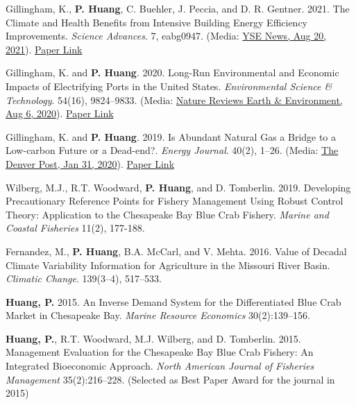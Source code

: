 



\begin{pubitems} %
	\item {Gillingham, K., \textbf{P. Huang}, C. Buehler, J. Peccia, and D. R. Gentner. 2021. The Climate and Health Benefits from Intensive Building Energy Efficiency Improvements. \textit{Science Advances}. 7, eabg0947. (Media: \href{https://environment.yale.edu/news/article/efficient-buildings-could-save-thousands-of-lives-in-us-every-year/}{YSE News, Aug 20, 2021}). \href{https://advances.sciencemag.org/content/7/34/eabg0947}{Paper Link}}
    \item {Gillingham, K. and {\bf P. Huang}. 2020. Long-Run Environmental and Economic Impacts of Electrifying Ports in the United States. \textit{Environmental Science \& Technology}. 54(16), 9824--9833. (Media: \href{https://www.nature.com/articles/s43017-020-0090-6}{Nature Reviews Earth \& Environment, Aug 6, 2020}). \href{https://www.dropbox.com/s/0g1fmsu6kdwhhhg/GillinghamHuang_EST2020.pdf?dl=0}{Paper Link}}
    \item {Gillingham, K. and {\bf P. Huang}. 2019. Is Abundant Natural Gas a Bridge to a Low-carbon Future or a Dead-end?. \textit{Energy Journal}. 40(2), 1--26. (Media: \href{https://www.denverpost.com/2020/01/31/colorado-natural-gas-bridge-fuel-wind-solar-xcel-tri-state/}{The Denver Post, Jan 31, 2020}). \href{https://www.iaee.org/en/Publications/ejarticle.aspx?id=3325}{Paper Link}}
    \item {Wilberg, M.J., R.T. Woodward, {\bf P. Huang}, and D. Tomberlin. 2019. Developing Precautionary Reference Points for Fishery Management Using Robust Control Theory: Application to the Chesapeake Bay Blue Crab Fishery. \textit{Marine and Coastal Fisheries} 11(2), 177-188.}
    \item {Fernandez, M., {\bf P. Huang}, B.A. McCarl, and V. Mehta. 2016. Value of Decadal Climate Variability Information for Agriculture in the Missouri River Basin. \textit{Climatic Change}. 139(3--4), 517--533.}
    \item {\textbf{Huang, P.} 2015. An Inverse Demand System for the Differentiated Blue Crab Market in Chesapeake Bay. {\itshape Marine Resource Economics} 30(2):139--156.}
    \item {\textbf{Huang, P.}, R.T. Woodward, M.J. Wilberg, and D. Tomberlin. 2015. Management Evaluation for the Chesapeake Bay Blue Crab Fishery: An Integrated Bioeconomic Approach. {\itshape North American Journal of Fisheries Management} 35(2):216--228. (Selected as Best Paper Award for the journal in 2015)}
\end{pubitems}


